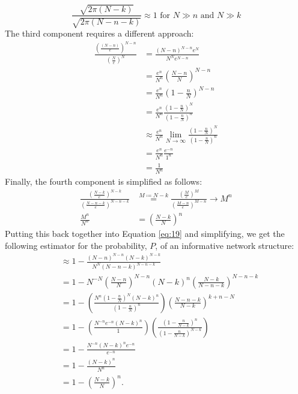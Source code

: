 \documentclass{article}
\theoremstyle{definition}
\begin{document}
\begin{equation}
    \frac{\sqrt{2 \pi \left(N-k\right)}}{\sqrt{2 \pi \left(N-n-k\right)}}\approx 1 \text{ for } N \gg n \text{ and } N \gg k \nonumber
\end{equation}
\noindent The third component requires a different approach:
    \begin{align}
    \frac{\left(\frac{\left(N-n\right)}{e}\right)^{N-n}}{{\left(\frac{N}{e}\right)^{N}}}&=\frac{\left(N-n\right)^{N-n}e^{N}}{N^{N}e^{N-n}} \nonumber\\
     &=\frac{e^{n}}{N^{n}}\left(\frac{N-n}{N}\right)^{N-n} \nonumber\\
     &=\frac{e^{n}}{N^{n}}\left(1-\frac{n}{N}\right)^{N-n} \nonumber\\
     &=\frac{e^{n}}{N^{n}}\frac{\left(1-\frac{n}{N}\right)^{N}}{\left(1-\frac{n}{N}\right)^{n}} \nonumber\\
     &\approx \frac{e^{n}}{N^{n}}\lim_{N \to \infty}\frac{\left(1-\frac{n}{N}\right)^{N}}{\left(1-\frac{n}{N}\right)^{n}} \nonumber\\
     &=\frac{e^{n}}{N^{n}}\frac{e^{-n}}{1^{n}} \nonumber\\
     &=\frac{1}{N^{n}} \nonumber
\end{align}
\noindent Finally, the fourth component is simplified as follows: 
\begin{align}
    \frac{\left(\frac{N-k}{e}\right)^{N-k}}{\left(\frac{N-n-k}{e}\right)^{N-n-k}}&\stackrel{M\coloneqq N-k}{=}\frac{\left(\frac{M}{e}\right)^{M}}{\left(\frac{M-n}{e}\right)^{M-n}}\to M^{n} \nonumber\\
    \frac{M^{n}}{N^{n}}&=\left(\frac{N-k}{N}\right)^{n}\nonumber
\end{align}
Putting this back together into Equation \ref{eq:19} and simplifying, we get the following estimator for the probability, $P$, of an informative network structure:
\begin{align}
    & \approx 1- \frac{\left(N-n\right)^{N-n}\left(N-k\right)^{N-k}}{N^{N}\left(N-n-k\right)^{N-n-k}} \nonumber\\
    &= 1- N^{-N}\left(\frac{N-n}{N}\right)^{N-n}\left(N-k\right)^{n}\left(\frac{N-k}{N-n-k}\right)^{N-n-k} \nonumber\\
    &=1-\left(\frac{N^{n}\left(1-\frac{n}{N}\right)^{N}\left(N-k\right)^{n}}{\left(1-\frac{n}{N}\right)^{n}}\right)\left(\frac{N-n-k}{N-k}\right)^{k+n-N} \nonumber\\
    &=1-\left(\frac{N^{-n}e^{-n}\left(N-k\right)^{n}}{1}\right)\left(\frac{\left(1-\frac{n}{N-k}\right)^{n}}{\left(1-\frac{n}{N-k}\right)^{N-k}}\right) \nonumber\\
    &=1-\frac{N^{-n}\left(N-k\right)^{n}e^{-n}}{e^{-n}} \nonumber\\
    &=1-\frac{\left(N-k\right)^{n}}{N^{n}} \nonumber\\
    &=1-\left(\frac{N-k}{N}\right)^{n}.\nonumber
\end{align}
\end{document}
